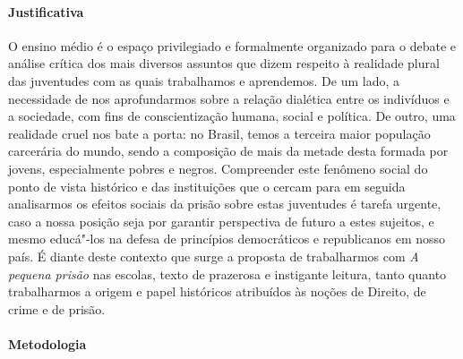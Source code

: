 \documentclass[11pt]{extarticle}
\begin{document}
\paragraph{Justificativa} O ensino médio é o espaço privilegiado e
formalmente organizado para o debate e análise crítica dos mais diversos
assuntos que dizem respeito à realidade plural das juventudes com as
quais trabalhamos e aprendemos. De um lado, a necessidade de nos
aprofundarmos sobre a relação dialética entre os indivíduos e a
sociedade, com fins de conscientização humana, social e política. De
outro, uma realidade cruel nos bate a porta: no Brasil, temos a terceira
maior população carcerária do mundo, sendo a composição de mais da
metade desta formada por jovens, especialmente pobres e negros.
Compreender este fenômeno social do ponto de vista histórico e das
instituições que o cercam para em seguida analisarmos os efeitos sociais
da prisão sobre estas juventudes é tarefa urgente, caso a nossa posição
seja por garantir perspectiva de futuro a estes sujeitos, e mesmo
educá"-los na defesa de princípios democráticos e republicanos em nosso
país. É diante deste contexto que surge a proposta de trabalharmos com
\emph{A pequena prisão} nas escolas, texto de prazerosa e instigante
leitura, tanto quanto trabalharmos a origem e papel históricos
atribuídos às noções de Direito, de crime e de prisão.

\paragraph{Metodologia} 
\end{document}
